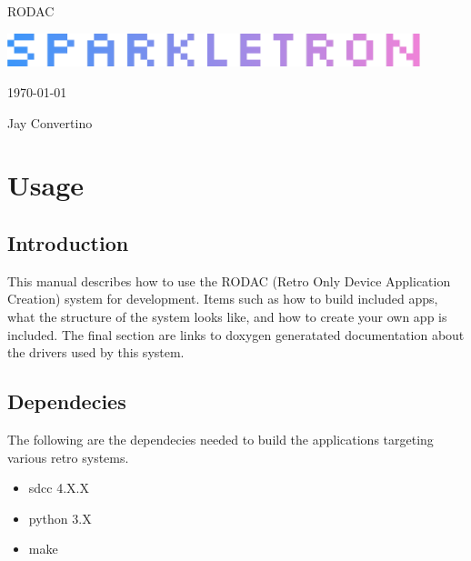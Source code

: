 \documentclass{article}
\begin{document}
  \begin{titlepage}
    \begin{center}

    {\Huge RODAC}

    \vspace{25mm}

    \includegraphics[width=0.90\textwidth,height=\textheight,keepaspectratio]{src/img/SPARKLETRON.png}

    \vspace{25mm}

    \today

    \vspace{15mm}

    {\Large Jay Convertino}

    \end{center}
  \end{titlepage}

  \tableofcontents

  \newpage

  \section{Usage}

  \subsection{Introduction}

  \par
  This manual describes how to use the RODAC (Retro Only Device Application Creation) system for development.
  Items such as how to build included apps, what the structure of the system looks like, and how to create your
  own app is included. The final section are links to doxygen generatated documentation about the drivers used
  by this system.

  \subsection{Dependecies}

  \par
  The following are the dependecies needed to build the applications targeting various retro systems.

  \begin{itemize}
    \item sdcc 4.X.X
    \item python 3.X
    \item make
  \end{itemize}
\end{document}
